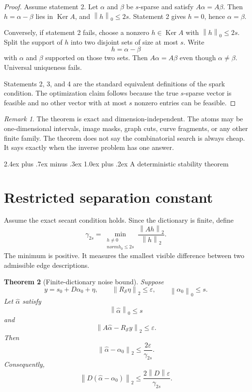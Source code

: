 \documentclass[11pt,oneside]{book}
\makeatletter
\renewcommand\chapter{\@startsection{chapter}{0}{\z@}%
  {2.4ex plus .7ex minus .3ex}%
  {1.0ex plus .2ex}%
  {\normalfont\LARGE\bfseries\color{Ink}}}
\newtheorem{theorem}{Theorem}[chapter]
\theoremstyle{remark}
\newtheorem{remark}[theorem]{Remark}
\newcommand{\Ker}{\operatorname{Ker}}
\newcommand{\norm}[1]{\left\lVert #1\right\rVert}
\newcommand{\RS}{R_{\mathcal S}}
\makeatother
\begin{document}
\begin{proof}
Assume statement 2. Let \(\alpha\) and \(\beta\) be \(s\)-sparse and satisfy \(A\alpha=A\beta\). Then \(h=\alpha-\beta\) lies in \(\Ker A\), and \(\norm{h}_0\le2s\). Statement 2 gives \(h=0\), hence \(\alpha=\beta\).

Conversely, if statement 2 fails, choose a nonzero \(h\in\Ker A\) with \(\norm{h}_0\le2s\). Split the support of \(h\) into two disjoint sets of size at most \(s\). Write
\[
h=\alpha-\beta
\]
with \(\alpha\) and \(\beta\) supported on those two sets. Then \(A\alpha=A\beta\) even though \(\alpha\ne\beta\). Universal uniqueness fails.

Statements 2, 3, and 4 are the standard equivalent definitions of the spark condition. The optimization claim follows because the true \(s\)-sparse vector is feasible and no other vector with at most \(s\) nonzero entries can be feasible.
\end{proof}

\begin{remark}
The theorem is exact and dimension-independent. The atoms may be one-dimensional intervals, image masks, graph cuts, curve fragments, or any other finite family. The theorem does not say the combinatorial search is always cheap. It says exactly when the inverse problem has one answer.
\end{remark}

\chapter{A deterministic stability theorem}
\section{Restricted separation constant}
Assume the exact secant condition holds. Since the dictionary is finite, define
\[
\boxed{
\gamma_{2s}
=
\min_{
\substack{h\ne0\\
norm{h}_0\le2s}
}
\frac{\norm{Ah}_2}{\norm{h}_2}.
}
\]
The minimum is positive. It measures the smallest visible difference between two admissible edge descriptions.

\begin{theorem}[Finite-dictionary noise bound]
Suppose
\[
y=s_0+D\alpha_0+\eta,
\qquad
\norm{\RS\eta}_2\le\varepsilon,
\qquad
\norm{\alpha_0}_0\le s.
\]
Let \(\widehat\alpha\) satisfy
\[
\norm{\widehat\alpha}_0\le s
\]
and
\[
\norm{A\widehat\alpha-\RS y}_2\le\varepsilon.
\]
Then
\[
\boxed{
\norm{\widehat\alpha-\alpha_0}_2
\le
\frac{2\varepsilon}{\gamma_{2s}}.
}
\]
Consequently,
\[
\norm{D(\widehat\alpha-\alpha_0)}_2
\le
\frac{2\norm{D}\varepsilon}{\gamma_{2s}}.
\]
\end{theorem}
\end{document}
